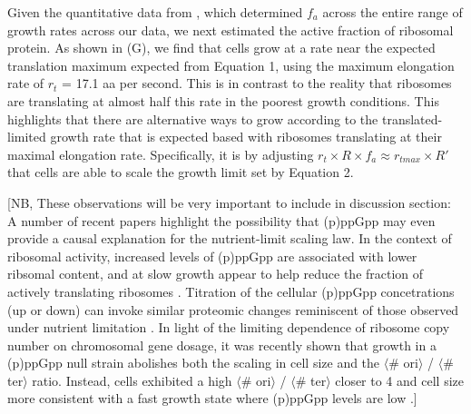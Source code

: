 Given the quantitative data from \cite{dai2018}, which determined $f_a$
across the entire range of growth rates across our data, we next estimated the
active fraction of ribosomal protein. As shown in (G), we
find that cells grow at a rate near the expected translation maximum expected
from Equation 1, using the maximum elongation rate of $r_t$ = 17.1 aa per
second. This is in contrast to the reality that ribosomes are translating at
almost half this rate in the poorest growth conditions. This highlights that
there are alternative ways to grow according to the translated-limited growth
rate that is expected based with ribosomes translating at their maximal
elongation rate. Specifically, it is by adjusting $r_t \times R \times f_a
\approx r_{tmax} \times R'$ that cells are able to scale the growth limit set by
Equation 2.

[NB, These observations will be very important to include in
discussion section: A number of recent papers highlight the possibility that
(p)ppGpp may even provide a causal explanation for the nutrient-limit scaling
law. In the context of ribosomal activity, increased levels of (p)ppGpp are
associated with lower ribsomal content, and at slow growth appear to help reduce
the fraction of actively translating ribosomes \citep{dai2016, dai2018}.
Titration of the cellular (p)ppGpp concetrations (up or down) can invoke similar
proteomic changes reminiscent of those observed under nutrient limitation
\citep{zhu2019}. In light of the limiting dependence of ribosome copy number on
chromosomal gene dosage, it was recently shown that growth in a (p)ppGpp  null
strain abolishes both the scaling in cell size  and the $\langle$\# ori$\rangle$
/ $\langle$\# ter$\rangle$ ratio. Instead, cells exhibited a high $\langle$\#
ori$\rangle$ / $\langle$\# ter$\rangle$ closer to 4 and cell size more
consistent with a fast growth state where (p)ppGpp levels are low
\citep{fernandezcoll2020}.]




